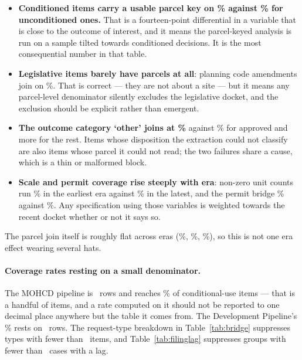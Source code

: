 \documentclass[11pt]{article}
\begin{document}
\begin{itemize}
\item \textbf{Conditioned items carry a usable parcel key on \acqSelCondParcel\% against
\acqSelUncondParcel\% for unconditioned ones.} That is a fourteen-point differential in a
variable that is close to the outcome of interest, and it means the parcel-keyed analysis is run on a sample tilted towards
conditioned decisions. It is the most consequential number in that table.
\item \textbf{Legislative items barely have parcels at all}: planning code amendments join on
\acqSelPcaParcel\%. That is correct --- they are not about a site --- but it means any parcel-level
denominator silently excludes the legislative docket, and the exclusion should be explicit
rather than emergent.
\item \textbf{The outcome category `other' joins at \acqSelOtherParcel\%} against
\acqSelApprovedParcel\% for approved and more for the rest. Items whose disposition the extraction could not classify are also
items whose parcel it could not read; the two failures share a cause, which is a thin or
malformed block.
\item \textbf{Scale and permit coverage rise steeply with era}: non-zero unit counts run
\acqSelUnitsEarly\% in the earliest era against \acqSelUnitsLate\% in the latest, and the
permit bridge \acqSelBridgeEarly\% against \acqSelBridgeLate\%. Any specification using those variables is weighted towards the recent docket whether
or not it says so.
\end{itemize}

The parcel join itself is roughly flat across eras (\acqSelParcelEraOne\%,
\acqSelParcelEraTwo\%, \acqSelParcelEraThree\%), so this is not one era effect wearing several
hats.

\paragraph{Coverage rates resting on a small denominator.} The MOHCD pipeline is
\acqMohcdRows\ rows and
reaches \acqCuMohcd\% of conditional-use items --- that is a handful of items, and a rate
computed on it should not be reported to one decimal place anywhere but the table it comes
from. The Development Pipeline's \acqCuPipeline\% rests on \acqPipelineRows\ rows. The
request-type breakdown in Table~\ref{tab:bridge} suppresses types with fewer than
\acqMinItemsBridge\ items, and Table~\ref{tab:filinglag} suppresses groups with fewer than
\acqMinCasesFig\ cases with a lag.
\end{document}
